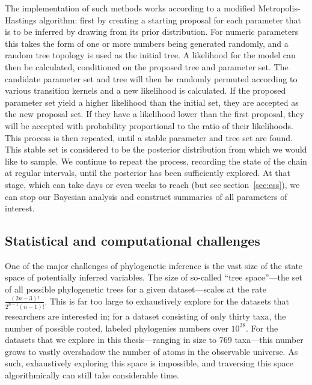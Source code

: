 The implementation of such methods works according to a modified Metropolis-Hastings algorithm: first by creating a starting proposal for each parameter that is to be inferred by drawing from its prior distribution.
For numeric parameters this takes the form of one or more numbers being generated randomly, and a random tree topology is used as the initial tree.
A likelihood for the model can then be calculated, conditioned on the proposed tree and parameter set.
The candidate parameter set and tree will then be randomly permuted according to various transition kernels and a new likelihood is calculated. %
If the proposed parameter set yield a higher likelihood than the initial set, they are accepted as the new proposal set.
If they have a likelihood lower than the first proposal, they will be accepted with probability proportional to the ratio of their likelihoods.
This process is then repeated, until a stable parameter and tree set are found.
This stable set is considered to be the posterior distribution from which we would like to sample.
We continue to repeat the process, recording the state of the chain at regular intervals, until the posterior has been sufficiently explored.
At that stage, which can take days or even weeks to reach (but see section~\ref{sec:ess}), we can stop our Bayesian analysis and construct summaries of all parameters of interest.



\subsection{Statistical and computational challenges} %

One of the major challenges of phylogenetic inference is the vast size of the state space of potentially inferred variables.
The size of so-called ``tree space''---the set of all possible phylogenetic trees for a given dataset---scales at the rate $\frac{(2n-3)!}{2^{n-1}(n-1)!}$.
This is far too large to exhaustively explore for the datasets that researchers are interested in; for a dataset consisting of only thirty taxa, the number of possible rooted, labeled phylogenies numbers over $10^{38}$\cite{felsenstein2003inferring}.
For the datasets that we explore in this thesis---ranging in size to 769 taxa---this number grows to vastly overshadow the number of atoms in the observable universe.
As such, exhaustively exploring this space is impossible, and traversing this space algorithmically can still take considerable time.


